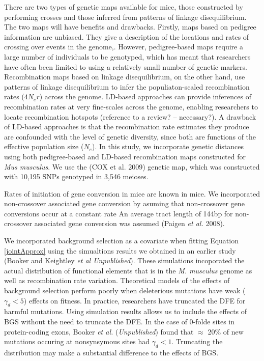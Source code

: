 \documentclass[11pt]{article}
\begin{document}
	There are two types of genetic maps available for mice, those constructed by performing crosses and those inferred from patterns of linkage disequilibrium. The two maps will have benefits and drawbacks. Firstly, maps based on pedigree information are unbiased. They give a description of the locations and rates of crossing over events in the genome,. However, pedigree-based maps require a large number of individuals to be genotyped, which has meant that researchers have often been limited to using a relatively small number of genetic markers. Recombination maps based on linkage disequilibrium, on the other hand, use patterns of linkage disequilibrium to infer the populiaton-scaled recombination rates ($4N_er$) across the genome. LD-based approaches can provide inferences of recombination rates at very fine-scales across the genome, enabling researchers to locate recombination hotspots (reference to a review? – necessary?). A drawback of LD-based approaches is that the recombination rate estimates they produce are confounded with the level of genetic diversity, since both are functions of the effective population size ($N_e$). In this study, we incorporate genetic distances using both pedigree-based and LD-based recombination maps constructed for \emph{Mus musculus}. We use the (COX et al. 2009) genetic map, which was constructed with 10,195 SNPs genotyped in 3,546 meioses. 


	Rates of initiation of gene conversion in mice are known in mice. We incorporated non-crossover associated gene conversion by asuming that non-crossover gene conversions occur at a constant rate
An average tract length of 144bp for non-crossover associated gene conversion was assumed (Paigen \textit{et al.} 2008). 
 
 
 	We incorporated background selection as a covariate when fitting Equation \ref{jointApprox} using the simualtions results we obtained in an earlier study (Booker and Keightley \textit{et al Unpublished}). These simulations incoporated the actual distribution of functional elements that is in the \textit{M. musculus} genome as well as recombination rate variation. Theoretical models of the effects of background selection perform poorly when deleterious mutations have weak ($\gamma_d < 5$) 	effects on fitness. In practice, researchers have truncated the DFE for harmful mutations. Using simulation results allows us to include the effects of BGS without the need to truncate the DFE. In the case of 0-folde sites in protein-coding exons, Booker \textit{et al.} (\textit{Unpublished}) found that $\approx$ 20\% of new mutations occuring at nonsynsymous sites had $\gamma_d < 1$. Truncating the distribution may make a substantial difference to the effects of BGS. 
 	
\end{document}
